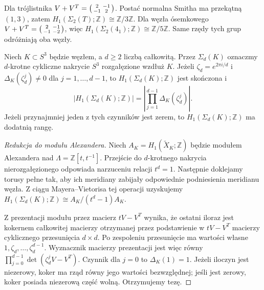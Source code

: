 \begin{przyklad}
Dla trójlistnika
$V+V^T=\begin{psmallmatrix}2&-1\\-1&2\end{psmallmatrix}$.
Postać normalna Smitha ma przekątną $(1,3)$,
zatem $H_1(\Sigma_2(T);\mathbb Z)\cong\mathbb Z/3\mathbb Z$.
Dla węzła ósemkowego
$V+V^T=\begin{psmallmatrix}2&-1\\-1&-2\end{psmallmatrix}$,
więc $H_1(\Sigma_2(4_1);\mathbb Z)\cong\mathbb Z/5\mathbb Z$.
Same rzędy tych grup odróżniają oba węzły.
\end{przyklad}

\begin{twierdzenie}
Niech $K\subset S^3$ będzie węzłem, a $d\ge2$ liczbą
całkowitą. Przez $\Sigma_d(K)$ oznaczmy $d$-krotne
cykliczne nakrycie $S^3$ rozgałęzione wzdłuż $K$.
Jeżeli $\zeta_d=e^{2\pi i/d}$ i
$\Delta_K(\zeta_d^j)\ne0$ dla $j=1,\dots,d-1$, to
$H_1(\Sigma_d(K);\mathbb Z)$ jest skończona i
\[
|H_1(\Sigma_d(K);\mathbb Z)|=
\left|\prod_{j=1}^{d-1}\Delta_K(\zeta_d^j)\right|.
\]
Jeżeli przynajmniej jeden z tych czynników jest zerem,
to $H_1(\Sigma_d(K);\mathbb Z)$ ma dodatnią rangę.
\end{twierdzenie}

\begin{proof}[Redukcja do modułu Alexandera]
Niech $A_K=H_1(\widetilde X_K;\mathbb Z)$ będzie modułem
Alexandera nad $\Lambda=\mathbb Z[t,t^{-1}]$.
Przejście do $d$-krotnego nakrycia nierozgałęzionego
odpowiada narzuceniu relacji $t^d=1$. Następnie
doklejamy torusy pełne tak, aby ich meridiany zabijały
odpowiednie podniesienia meridianu węzła. Z ciągu
Mayera--Vietorisa tej operacji uzyskujemy
$H_1(\Sigma_d(K);\mathbb Z)\cong A_K/(t^d-1)A_K$.

Z prezentacji modułu przez macierz $tV-V^T$
wynika, że ostatni iloraz jest kokernem całkowitej
macierzy otrzymanej przez podstawienie w $tV-V^T$
macierzy cyklicznego przesunięcia $d\times d$.
Po zespoleniu przesunięcie ma wartości własne
$1,\zeta_d,\dots,\zeta_d^{d-1}$. Wyznacznik
macierzy prezentacji jest więc równy
$\prod_{j=0}^{d-1}\det(\zeta_d^jV-V^T)$.
Czynnik dla $j=0$ to $\Delta_K(1)=1$.
Jeżeli iloczyn jest niezerowy, koker ma rząd równy
jego wartości bezwzględnej; jeśli jest zerowy, koker
posiada niezerową część wolną. Otrzymujemy tezę.
\end{proof}


